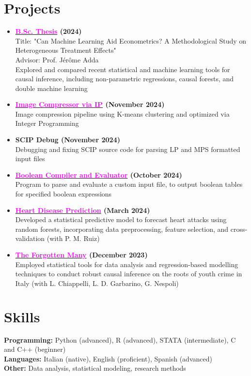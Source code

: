 \documentclass[letterpaper,11pt]{article}
\newcommand{\resumeProjectItem}[2]{
  \item
  \textbf{\color{black}\small #1} \\
  {\footnotesize #2}
  \vspace{0.05cm}
}
\newcommand{\resumeSubHeadingListStart}{\begin{itemize}[leftmargin=0in, label={}]}
\newcommand{\resumeSubHeadingListEnd}{\end{itemize}}
\begin{document}
\section{Projects}
\resumeSubHeadingListStart
\resumeProjectItem{\href{https://matildedol.github.io/files/bscthesis.pdf}{\textcolor{magenta}{B.Sc. Thesis}} (2024)}{
    Title: "Can Machine Learning Aid Econometrics? A Methodological Study on Heterogeneous Treatment Effects" \\
    Advisor: Prof. Jérôme Adda \\
    Explored and compared recent statistical and machine learning tools for causal inference, including non-parametric regressions, causal forests, and double machine learning
}

\resumeProjectItem{\href{https://github.com/matildedol/algorithms-bocconi/tree/main/image-compression-IP}{\textcolor{magenta}{Image Compressor via IP}} (November 2024)}{
    Image compression pipeline using K-means clustering and optimized via Integer Programming 
}
 \resumeProjectItem{SCIP Debug (November 2024)}{
     Debugging and fixing SCIP source code for parsing LP and MPS formatted input files
 }
\resumeProjectItem{\href{https://github.com/matildedol/software-eng-bocconi/tree/main/boolean-compiler}{\textcolor{magenta}{Boolean Compiler and Evaluator}}
(October 2024)}{
    Program to parse and evaluate a custom input file, to output boolean tables for specified boolean expressions
}
\resumeProjectItem{\href{https://matildedol.github.io/files/pred_heart_disease.pdf}{\textcolor{magenta}{Heart Disease Prediction}} (March 2024)}{
    Developed a statistical predictive model to forecast heart attacks using random forests, incorporating data preprocessing, feature selection, and cross-validation (with P. M. Ruiz)
}
\resumeProjectItem{\href{https://matildedol.github.io/files/the_forgotten_many.pdf}{\textcolor{magenta}{The Forgotten Many}} (December 2023)}{
    Employed statistical tools for data analysis and regression-based modelling techniques to conduct robust causal inference on the roots of youth crime in Italy (with L. Chiappelli, L. D. Garbarino, G. Nespoli)
}
\resumeSubHeadingListEnd
\vspace*{-0.4cm}
\section{Skills}
\small
\textbf{Programming:} Python (advanced), R (advanced), STATA (intermediate), C and C++ (beginner) \\
\textbf{Languages:}  Italian (native), English (proficient), Spanish (advanced) \\
\textbf{Other:} Data analysis, statistical modeling, research methods
\end{document}
